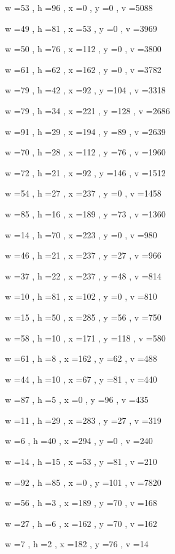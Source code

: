 \documentclass[11pt]{article}
\begin{document}
w =53 , h =96 , x =0 , y =0 , v =5088
\par
w =49 , h =81 , x =53 , y =0 , v =3969
\par
w =50 , h =76 , x =112 , y =0 , v =3800
\par
w =61 , h =62 , x =162 , y =0 , v =3782
\par
w =79 , h =42 , x =92 , y =104 , v =3318
\par
w =79 , h =34 , x =221 , y =128 , v =2686
\par
w =91 , h =29 , x =194 , y =89 , v =2639
\par
w =70 , h =28 , x =112 , y =76 , v =1960
\par
w =72 , h =21 , x =92 , y =146 , v =1512
\par
w =54 , h =27 , x =237 , y =0 , v =1458
\par
w =85 , h =16 , x =189 , y =73 , v =1360
\par
w =14 , h =70 , x =223 , y =0 , v =980
\par
w =46 , h =21 , x =237 , y =27 , v =966
\par
w =37 , h =22 , x =237 , y =48 , v =814
\par
w =10 , h =81 , x =102 , y =0 , v =810
\par
w =15 , h =50 , x =285 , y =56 , v =750
\par
w =58 , h =10 , x =171 , y =118 , v =580
\par
w =61 , h =8 , x =162 , y =62 , v =488
\par
w =44 , h =10 , x =67 , y =81 , v =440
\par
w =87 , h =5 , x =0 , y =96 , v =435
\par
w =11 , h =29 , x =283 , y =27 , v =319
\par
w =6 , h =40 , x =294 , y =0 , v =240
\par
w =14 , h =15 , x =53 , y =81 , v =210
\par
w =92 , h =85 , x =0 , y =101 , v =7820
\par
w =56 , h =3 , x =189 , y =70 , v =168
\par
w =27 , h =6 , x =162 , y =70 , v =162
\par
w =7 , h =2 , x =182 , y =76 , v =14
\par
\newpage
\end{document}
